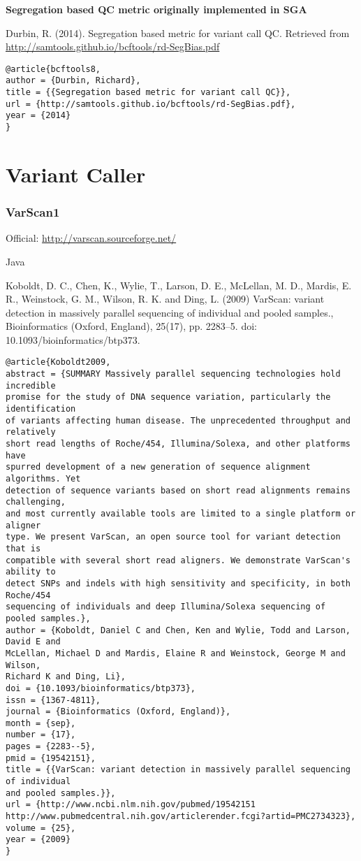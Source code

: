 \documentclass[]{article}
\begin{document}
\textbf{Segregation based QC metric originally implemented in SGA}

Durbin, R. (2014). Segregation based metric for variant call QC. Retrieved from \url{http://samtools.github.io/bcftools/rd-SegBias.pdf}

\begin{verbatim}
@article{bcftools8,
author = {Durbin, Richard},
title = {{Segregation based metric for variant call QC}},
url = {http://samtools.github.io/bcftools/rd-SegBias.pdf},
year = {2014}
}
\end{verbatim}

\part{Variant Caller}

\section{VarScan1}

Official: \url{http://varscan.sourceforge.net/}

Java

Koboldt, D. C., Chen, K., Wylie, T., Larson, D. E., McLellan, M. D., Mardis, E. R., Weinstock, G. M., Wilson, R. K. and Ding, L. (2009) VarScan: variant detection in massively parallel sequencing of individual and pooled samples., Bioinformatics (Oxford, England), 25(17), pp. 2283–5. doi: 10.1093/bioinformatics/btp373.

\begin{verbatim}
@article{Koboldt2009,
abstract = {SUMMARY Massively parallel sequencing technologies hold incredible
promise for the study of DNA sequence variation, particularly the identification
of variants affecting human disease. The unprecedented throughput and relatively
short read lengths of Roche/454, Illumina/Solexa, and other platforms have
spurred development of a new generation of sequence alignment algorithms. Yet
detection of sequence variants based on short read alignments remains challenging,
and most currently available tools are limited to a single platform or aligner
type. We present VarScan, an open source tool for variant detection that is
compatible with several short read aligners. We demonstrate VarScan's ability to
detect SNPs and indels with high sensitivity and specificity, in both Roche/454
sequencing of individuals and deep Illumina/Solexa sequencing of pooled samples.},
author = {Koboldt, Daniel C and Chen, Ken and Wylie, Todd and Larson, David E and
McLellan, Michael D and Mardis, Elaine R and Weinstock, George M and Wilson,
Richard K and Ding, Li},
doi = {10.1093/bioinformatics/btp373},
issn = {1367-4811},
journal = {Bioinformatics (Oxford, England)},
month = {sep},
number = {17},
pages = {2283--5},
pmid = {19542151},
title = {{VarScan: variant detection in massively parallel sequencing of individual
and pooled samples.}},
url = {http://www.ncbi.nlm.nih.gov/pubmed/19542151
http://www.pubmedcentral.nih.gov/articlerender.fcgi?artid=PMC2734323},
volume = {25},
year = {2009}
}

\end{verbatim}
\end{document}
